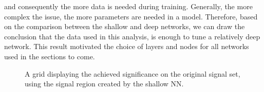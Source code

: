 and consequently the more data is needed during training. Generally, the more complex the issue, the more parameters are needed in a model. Therefore, 
based on the comparison between the shallow and deep networks, we can draw the conclusion that the data used in this analysis, is enough to tune a relatively 
deep network. This result motivated the choice of layers and nodes for all networks used in the sections to come.
\begin{figure}
    \caption{A grid displaying the achieved significance on the original signal set, using the signal region 
    created by the shallow \ac{NN}.}
    \label{fig:NNshallowGridSig}
\end{figure}
